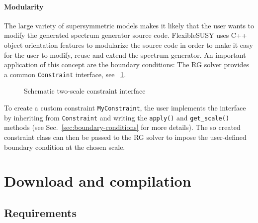 \documentclass[final,3p,11pt,pdflatex]{elsarticle}
\newcommand{\fs}{FlexibleSUSY\xspace}
\newcommand{\code}[1]{\lstinline|#1|}  %
\newcommand{\figref}[1]{\figurename~\ref{#1}}
\newcommand{\secref}[1]{Sec.~\ref{#1}}
\begin{document}
\paragraph{Modularity}
The large variety of supersymmetric models makes it likely that the
user wants to modify the generated spectrum generator source code.
\fs uses C++ object orientation features to modularize the source code
in order to make it easy for the user to modify, reuse and extend the
spectrum generator.  An important application of this concept are the
boundary conditions: The RG solver provides a common \code{Constraint}
interface, see \figref{fig:schematic-two-scale-constraint-interface}.
%
\begin{figure}
  \centering
  \caption{Schematic two-scale constraint interface}
  \label{fig:schematic-two-scale-constraint-interface}
\end{figure}
%
To create a custom constraint \code{MyConstraint}, the user implements
the interface by inheriting from \code{Constraint} and writing the
\code{apply()} and \code{get_scale()} methods (see
\secref{sec:boundary-conditions} for more details).  The so created
constraint class can then be passed to the RG solver to impose the
user-defined boundary condition at the chosen scale.

\section{Download and compilation}
\label{Sec:download}

\subsection{Requirements}
\end{document}
